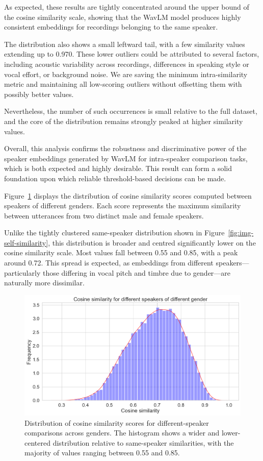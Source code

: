 \documentclass[conference]{IEEEtran}
\begin{document}
As expected, these results are tightly concentrated around the upper bound of the cosine similarity scale, showing that the WavLM model produces highly consistent embeddings for recordings belonging to the same speaker. 

The distribution also shows a small leftward tail, with a few similarity values extending up to 0.970. These lower outliers could be attributed to several factors, including acoustic variability across recordings, differences in speaking style or vocal effort, or background noise. We are saving the minimum intra-similarity metric and maintaining all low-scoring outliers without offsetting them with possibly better values.

Nevertheless, the number of such occurrences is small relative to the full dataset, and the core of the distribution remains strongly peaked at higher similarity values.

Overall, this analysis confirms the robustness and discriminative power of the speaker embeddings generated by WavLM for intra-speaker comparison tasks, which is both expected and highly desirable. This result can form a solid foundation upon which reliable threshold-based decisions can be made.


Figure~\ref{fig:img-similarity} displays the distribution of cosine similarity scores computed between speakers of different genders. Each score represents the maximum similarity between utterances from two distinct male and female speakers.

Unlike the tightly clustered same-speaker distribution shown in Figure~\ref{fig:img-self-similarity}, this distribution is broader and centred significantly lower on the cosine similarity scale. Most values fall between 0.55 and 0.85, with a peak around 0.72. This spread is expected, as embeddings from different speakers—particularly those differing in vocal pitch and timbre due to gender—are naturally more dissimilar.

\begin{figure}[H]
	\centering
	\includegraphics[width=0.7\linewidth]{img/img-similarity}
	\caption{Distribution of cosine similarity scores for different-speaker comparisons across genders. The histogram shows a wider and lower-centered distribution relative to same-speaker similarities, with the majority of values ranging between 0.55 and 0.85.}
	\label{fig:img-similarity}
\end{figure}
\end{document}
